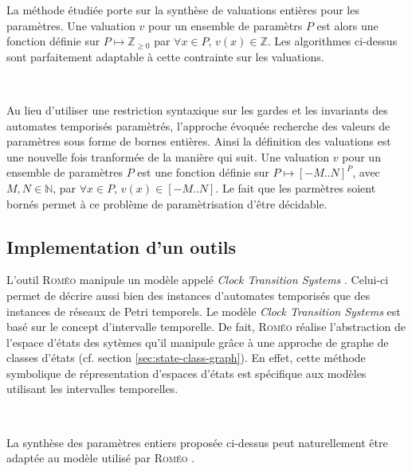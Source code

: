 \documentclass{article}
\begin{document}
        \vspace{1em}

        La méthode étudiée porte sur la synthèse de valuations entières pour les
        paramètres. Une valuation $v$ pour un ensemble de paramètrs $P$ est
        alors une fonction définie sur $P \mapsto \mathbb{Z}_{\geq 0}$ par
        $\forall x \in P$, $v(x) \in \mathbb{Z}$. Les algorithmes ci-dessus sont
        parfaitement adaptable à cette contrainte sur les valuations.


        ~

        Au lieu d'utiliser une restriction syntaxique sur les gardes et les
        invariants des automates temporisés paramètrés, l'approche évoquée
        recherche des valeurs de paramètres sous forme de bornes entières. Ainsi
        la définition des valuations est une nouvelle fois tranformée de la
        manière qui suit. Une valuation $v$ pour un ensemble de paramètres $P$
        est une fonction définie sur $P \mapsto [-M..N]^P$, avec $M, N \in
        \mathbb{N}$, par $\forall x \in P$, $v(x) \in [-M..N]$. Le fait que les
        parmètres soient bornés permet à ce problème de paramètrisation d'être
        décidable.

    \subsection{Implementation d'un outils}
    
      L'outil \textsc{Roméo} \cite{gardey05} manipule un modèle appelé {\it
        Clock Transition Systems} \cite{lime12}. Celui-ci permet de décrire
      aussi bien des instances d'automates temporisés que des instances de
      réseaux de Petri temporels. Le modèle {\it Clock Transition Systems} est
      basé sur le concept d'intervalle temporelle. De fait, \textsc{Roméo}
      réalise l'abstraction de l'espace d'états des sytèmes qu'il manipule grâce
      à une approche de graphe de classes d'états (cf. section
      \ref{sec:state-class-graph}). En effet, cette méthode symbolique de
      répresentation d'espaces d'états est spécifique aux modèles utilisant les
      intervalles temporelles.

      ~

      La synthèse des paramètres entiers proposée ci-dessus peut naturellement
      être adaptée au modèle utilisé par \textsc{Roméo} \cite{jovanovic14}.
\end{document}
